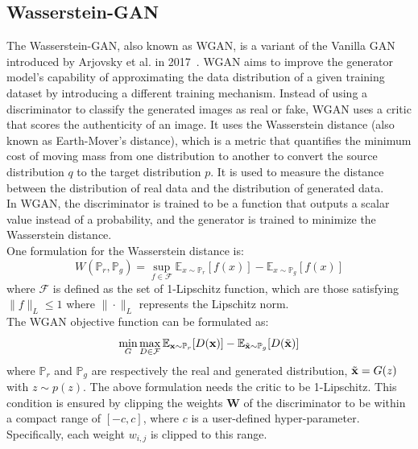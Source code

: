 \subsection{Wasserstein-GAN}
\label{sec:wgan}
The Wasserstein-GAN, also known as WGAN, is a variant of the Vanilla GAN introduced by Arjovsky et al. in 2017~\cite{wgan}. WGAN aims to improve the generator model's capability of approximating the data distribution of a given training dataset by introducing a different training mechanism. Instead of using a discriminator to classify the generated images as real or fake, WGAN uses a critic that scores the authenticity of an image. It uses the Wasserstein distance (also known as Earth-Mover's distance), which is a metric that quantifies the minimum cost of moving mass from one distribution to another to convert the source distribution $q$ to the target distribution $p$. It is used to measure the distance between the distribution of real data and the distribution of generated data.\\
In WGAN, the discriminator is trained to be a function that outputs a scalar value instead of a probability, and the generator is trained to minimize the Wasserstein distance.\\
One formulation for the Wasserstein distance is:
\begin{equation}
    \label{eq:waaserstein distance}
    W(\mathbb{P}_r , \mathbb{P}_g)= \sup_{f \in \mathcal{F}} \mathbb{E}_{x\sim \mathbb{P}_r}[f(x)] - \mathbb{E}_{x \sim \mathbb{P}_g}[f(x)]
\end{equation}
where $\mathcal{F}$ is defined as the set of 1-Lipschitz function, which are those satisfying $\|f\|_L \leq 1$ where $\| \cdot \|_L$ represents the Lipschitz norm.\\
The WGAN objective function can be formulated as:
\begin{equation}
    \min_G \max_{D \in \mathcal{F}} \mathbb{E}_{\mathbf{x} \sim \mathbb{P}_r} [D(\mathbf{x})] - \mathbb{E}_{\Tilde{\mathbf{x}} \sim \mathbb{P}_g}[D(\Tilde{\mathbf{x}})]
\end{equation}
where $\mathbb{P}_r$ and $\mathbb{P}_g$ are respectively the real and generated distribution, $\Tilde{\mathbf{x}} = G(z)$ with $z \sim p(z)$.
The above formulation needs the critic to be 1-Lipschitz. This condition is ensured by clipping the weights $\mathbf{W}$ of the discriminator to be within a compact range of $[-c ,c]$, where $c$ is a user-defined hyper-parameter. Specifically, each weight $w_{i,j}$ is clipped to this range.\\ \\

